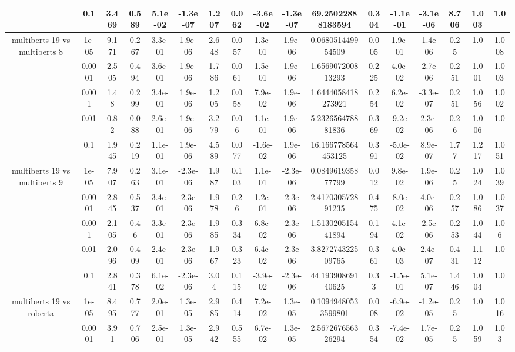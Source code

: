 \begin{tabular}{|c|c|c|c|c|c|c|c|c|c|c|c|c|c|c|c|c|}
 & 0.1 & 3.469 & 0.589 & 5.1e-02 & -1.3e-07 & 1.207 & 0.062 & -3.6e-02 & -1.3e-07 & 69.25022888183594 & 0.304 & -1.1e-01 & -3.1e-06 & 8.706 & 1.003 & 1.0 \\
\hline
\multirow{5}{*}{multiberts 19 vs multiberts 8} & 1e-05 & 9.171 & 0.267 & 3.3e-01 & 1.9e-06 & 2.648 & 0.057 & 1.3e-01 & 1.9e-06 & 0.068051449954509 & 0.005 & 1.9e-01 & -1.4e-06 & 0.25 & 1.0 & 1.008 \\
 & 0.0001 & 2.505 & 0.494 & 3.6e-01 & 1.9e-06 & 1.786 & 0.061 & 1.5e-01 & 1.9e-06 & 1.656907200813293 & 0.225 & 4.0e-02 & -2.7e-06 & 0.251 & 1.001 & 1.003 \\
 & 0.001 & 1.48 & 0.299 & 3.4e-01 & 1.9e-06 & 1.205 & 0.058 & 7.9e-02 & 1.9e-06 & 1.6444058418273921 & 0.254 & 6.2e-02 & -3.3e-07 & 0.251 & 1.056 & 1.002 \\
 & 0.01 & 0.82 & 0.088 & 2.6e-01 & 1.9e-06 & 3.279 & 0.06 & 1.1e-01 & 1.9e-06 & 5.232656478881836 & 0.369 & -9.2e-02 & 2.3e-06 & 0.26 & 1.006 & 1.0 \\
 & 0.1 & 1.945 & 0.219 & 1.1e-01 & 1.9e-06 & 4.589 & 0.077 & -1.6e-02 & 1.9e-06 & 16.166778564453125 & 0.391 & -5.0e-02 & 8.9e-07 & 1.77 & 1.217 & 1.051 \\
\hline
\multirow{5}{*}{multiberts 19 vs multiberts 9} & 1e-05 & 7.907 & 0.263 & 3.1e-01 & -2.3e-06 & 1.987 & 0.103 & 1.1e-01 & -2.3e-06 & 0.084961935877799 & 0.012 & 9.8e-02 & 1.9e-06 & 0.25 & 1.024 & 1.039 \\
 & 0.0001 & 2.845 & 0.537 & 3.4e-01 & -2.3e-06 & 1.978 & 0.26 & 1.2e-01 & -2.3e-06 & 2.417030572891235 & 0.475 & -8.0e-02 & 4.0e-06 & 0.257 & 1.086 & 1.037 \\
 & 0.001 & 2.105 & 0.46 & 3.3e-01 & -2.3e-06 & 1.985 & 0.334 & 6.8e-02 & -2.3e-06 & 1.513020515441894 & 0.194 & 4.1e-02 & -2.5e-06 & 0.253 & 1.044 & 1.06 \\
 & 0.01 & 2.096 & 0.409 & 2.4e-01 & -2.3e-06 & 1.967 & 0.323 & 6.4e-02 & -2.3e-06 & 3.827274322509765 & 0.361 & 4.0e-03 & 2.4e-07 & 0.431 & 1.112 & 1.0 \\
 & 0.1 & 2.841 & 0.378 & 6.1e-02 & -2.3e-06 & 3.04 & 0.115 & -3.9e-02 & -2.3e-06 & 44.19390869140625 & 0.33 & -1.5e-01 & 5.1e-07 & 1.446 & 1.004 & 1.0 \\
\hline
\multirow{5}{*}{multiberts 19 vs roberta } & 1e-05 & 8.495 & 0.777 & 2.0e-01 & 1.3e-05 & 2.985 & 0.414 & 7.2e-02 & 1.3e-05 & 0.10949480533599801 & 0.008 & -6.9e-02 & -1.2e-05 & 0.25 & 1.0 & 1.016 \\
 & 0.0001 & 3.91 & 0.706 & 2.5e-01 & 1.3e-05 & 2.942 & 0.555 & 6.7e-02 & 1.3e-05 & 2.567267656326294 & 0.354 & -7.4e-02 & 1.7e-05 & 0.25 & 1.059 & 1.03 \\

\end{tabular}
